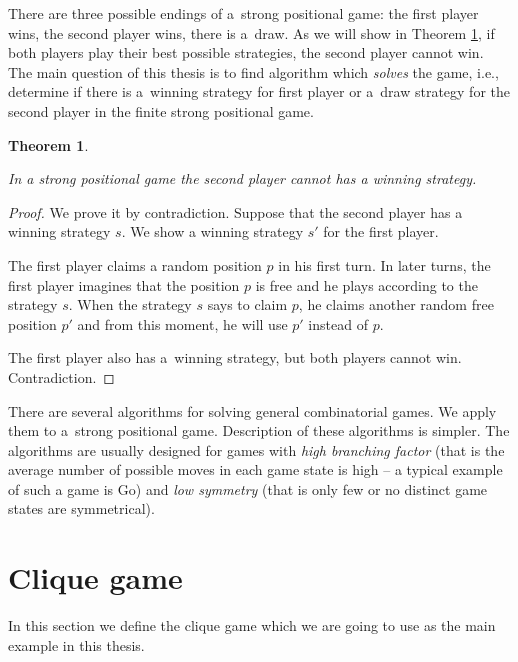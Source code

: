 There are three possible endings of a~strong positional game: the first player
wins, the second player wins, there is a~draw. As we will show in Theorem
\ref{stealingStrategy}, if both players play their best possible strategies,
the second player cannot win. The main question of this thesis is to find
algorithm which \emph{solves} the game, i.e., determine if there is a~winning
strategy for first player or a~draw strategy for the second player in the
finite strong positional game.

\newtheorem{stealingStrategy}{Theorem} 
\begin{stealingStrategy} \label{stealingStrategy} 

In a strong positional game the second player cannot has a winning strategy.

\end{stealingStrategy}

\begin{proof}

We prove it by contradiction. Suppose that the second player has a winning strategy
$s$. We show a winning strategy $s'$ for the first player. 

The first player claims a random position $p$ in his first turn. In later
turns, the first player imagines that the position $p$ is free and he plays
according to the strategy $s$. When the strategy $s$ says to claim $p$, he claims
another random free position $p'$ and from this moment, he will use $p'$ instead
of $p$.

The first player also has a~winning strategy, but both players cannot win.
Contradiction. 

\end{proof}

There are several algorithms for solving general combinatorial games. We apply
them to a~strong positional game. Description of these algorithms is simpler.
The algorithms are usually designed for games with \emph{high branching factor}
(that is the average number of possible moves in each game state is high --
a typical example of such a game is Go) and \emph{low
symmetry} (that is only few or no distinct game states are symmetrical). 


\section{Clique game}

In this section we define the clique game which we are going to use as the
main example in this thesis.

